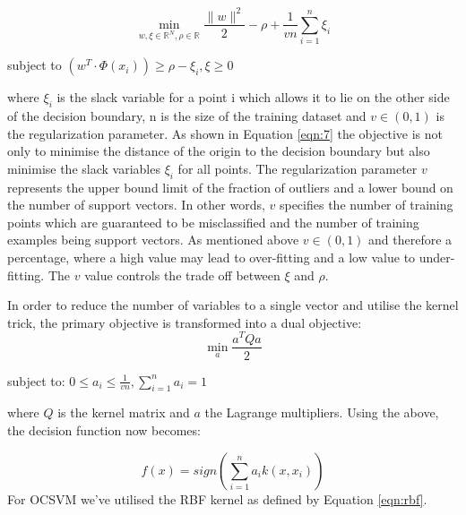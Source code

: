 \documentclass{mpaper}
\begin{document}
\begin{equation}\label{eqn:7}
    \min_{w, \xi \in \mathbb{R}^N, \rho\in\mathbb{R}} \frac{\parallel{w}\parallel^2}{2} - \rho + \frac{1}{vn}\sum_{i=1}^n \xi_i 
\end{equation}
\begin{center}
subject to $(w^T \cdot \Phi(x_i)) \geq \rho - \xi_i, \xi \geq 0$
\end{center}
where $\xi_i$ is the slack variable for a point i which allows it to lie on the other side of the decision boundary, n is the size of the training dataset and $v \in (0,1)$ is the regularization parameter. As shown in Equation \ref{eqn:7} the objective is not only to minimise the distance of the origin to the decision boundary but also minimise the slack variables $\xi_i$ for all points. The regularization parameter $v$ represents the upper bound limit of the fraction of outliers and a lower bound on the number of support vectors. In other words, $v$ specifies the number of training points which are guaranteed to be misclassified and the number of training examples being support vectors. As mentioned above $v \in (0,1)$ and therefore a percentage, where a high value may lead to over-fitting and a low value to under-fitting. The $v$ value controls the trade off between $\xi$ and $\rho$.

In order to reduce the number of variables to a single vector and utilise the kernel trick, the primary objective is transformed into a dual objective:
\begin{equation}
    \min_a \frac{a^TQa}{2}
\end{equation}
\begin{center}
    subject to: $0 \leq a_i \leq \frac{1}{vn}, \sum_{i=1}^n a_i = 1$
\end{center}
where $Q$ is the kernel matrix and $a$ the Lagrange multipliers. Using the above, the decision function now becomes:

\begin{equation}
    f(x) = sign(\sum_{i=1}^n a_i k(x, x_i))
\end{equation}
For OCSVM we've utilised the RBF kernel as defined by Equation \ref{eqn:rbf}.


\end{document}
